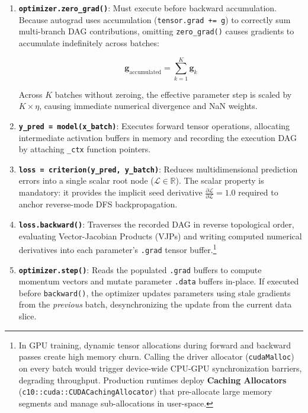 \documentclass[
  letterpaper,
]{scrbook}
\begin{document}
\begin{enumerate}
\def\labelenumi{\arabic{enumi}.}
\item
  \textbf{\texttt{optimizer.zero\_grad()}}: Must execute before backward
  accumulation. Because autograd uses accumulation
  (\texttt{tensor.grad\ +=\ g}) to correctly sum multi-branch DAG
  contributions, omitting \texttt{zero\_grad()} causes gradients to
  accumulate indefinitely across batches:

  \[\mathbf{g}_{\text{accumulated}} = \sum_{k=1}^K \mathbf{g}_k\]

  Across \(K\) batches without zeroing, the effective parameter step is
  scaled by \(K \times \eta\), causing immediate numerical divergence
  and NaN weights.
\item
  \textbf{\texttt{y\_pred\ =\ model(x\_batch)}}: Executes forward tensor
  operations, allocating intermediate activation buffers in memory and
  recording the execution DAG by attaching \texttt{\_ctx} function
  pointers.
\item
  \textbf{\texttt{loss\ =\ criterion(y\_pred,\ y\_batch)}}: Reduces
  multidimensional prediction errors into a single scalar root node
  (\(\mathcal{L} \in \mathbb{R}\)). The scalar property is mandatory: it
  provides the implicit seed derivative
  \(\frac{\partial \mathcal{L}}{\partial \mathcal{L}} = 1.0\) required
  to anchor reverse-mode DFS backpropagation.
\item
  \textbf{\texttt{loss.backward()}}: Traverses the recorded DAG in
  reverse topological order, evaluating Vector-Jacobian Products (VJPs)
  and writing computed numerical derivatives into each parameter's
  \texttt{.grad} tensor buffer.\footnote{In GPU training, dynamic tensor
    allocations during forward and backward passes create high memory
    churn. Calling the driver allocator (\texttt{cudaMalloc}) on every
    batch would trigger device-wide CPU-GPU synchronization barriers,
    degrading throughput. Production runtimes deploy \textbf{Caching
    Allocators} (\texttt{c10::cuda::CUDACachingAllocator}) that
    pre-allocate large memory segments and manage sub-allocations in
    user-space.}
\item
  \textbf{\texttt{optimizer.step()}}: Reads the populated \texttt{.grad}
  buffers to compute momentum vectors and mutate parameter
  \texttt{.data} buffers in-place. If executed before
  \texttt{backward()}, the optimizer updates parameters using stale
  gradients from the \emph{previous} batch, desynchronizing the update
  from the current data slice.
\end{enumerate}
\end{document}
